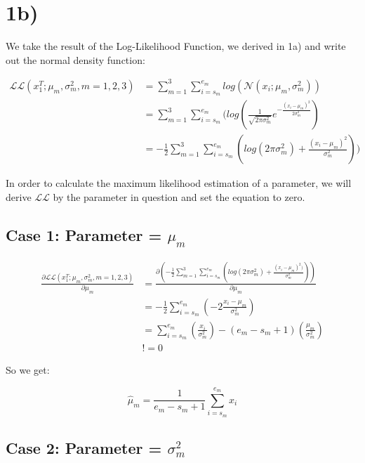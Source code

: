 \section*{1b)} %
\label{sec:1b}

We take the result of the Log-Likelihood Function, we derived in 1a) and write out the normal density function:

\begin{align}
\mathcal{L}\mathcal{L}(x_1^T; \mu_m, \sigma_m^2, m = 1,2,3) &= \sum_{m=1}^{3}\sum_{i=s_m}^{e_m}log(\mathcal{N}(x_i; \mu_m, \sigma_m^2)) \\
&= \sum_{m=1}^{3}\sum_{i=s_m}^{e_m}(log(\frac{1}{\sqrt{2\pi\sigma_m^2}}e^{-\frac{(x_i - \mu_m)^2}{2\sigma_m^2}}) \\
&= -\frac{1}{2}\sum_{m=1}^{3}\sum_{i=s_m}^{e_m}(log(2\pi\sigma_m^2)+\frac{(x_i - \mu_m)^2}{\sigma_m^2}))
\end{align}

In order to calculate the maximum likelihood estimation of a parameter, we will derive $\mathcal{L}\mathcal{L}$ by the parameter in 
question and set the equation to zero. 

\subsection*{Case 1: Parameter = $\mu_m$} %
\label{sub:_mu}

\begin{align}
\frac{\partial\mathcal{L}\mathcal{L}(x_1^T; \mu_m, \sigma_m^2, m = 1,2,3)}{\partial\mu_m} &= \frac{\partial(-\frac{1}{2}\sum_{m=1}^{3}\sum_{i=s_m}^{e_m}(log(2\pi\sigma_m^2)+\frac{(x_i - \mu_m)^2)}{\sigma_m^2}))}{\partial\mu_m} \\
&= -\frac{1}{2}\sum_{i=s_m}^{e_m}(-2\frac{x_i - \mu_m}{\sigma_m^2}) \\
&= \sum_{i=s_m}^{e_m}(\frac{x_i}{\sigma_m^2}) - (e_m - s_m + 1)( \frac{\mu_m}{\sigma_m^2}) \\
&!= 0
\end{align}

So we get:

\[
\hat{\mu}_m = \frac{1}{e_m - s_m + 1}\sum_{i=s_m}^{e_m}x_i
\]




\subsection*{Case 2: Parameter = $\sigma_m^2$} %
\label{sub:_sigma_m}

